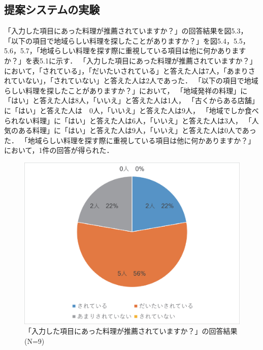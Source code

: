 \documentclass{funthesis}
\begin{document}
\subsection{提案システムの実験}
「入力した項目にあった料理が推薦されていますか？」の回答結果を図5.3，
「以下の項目で地域らしい料理を探したことがありますか？」を図5.4，5.5，5.6，5.7，「地域らしい料理を探す際に重視している項目は他に何かありますか？」を表5.1に示す．
「入力した項目にあった料理が推薦されていますか？」において，「されている」，「だいたいされている」と答えた人は7人，「あまりされていない」，「されていない」と答えた人は2人であった．
「以下の項目で地域らしい料理を探したことがありますか？」において，
「地域発祥の料理」に「はい」と答えた人は8人，「いいえ」と答えた人は1人，
「古くからある店舗」に「はい」と答えた人は　0人，「いいえ」と答えた人は9人，
「地域でしか食べられない料理」に「はい」と答えた人は6人，「いいえ」と答えた人は3人，
「人気のある料理」に「はい」と答えた人は9人，「いいえ」と答えた人は0人であった．
「地域らしい料理を探す際に重視している項目は他に何かありますか？」において，1件の回答が得られた．

\begin{figure}[tbp]
  \begin{center}
    \includegraphics[clip,width=12cm]{5.3.eps}
    \caption[「入力した項目にあった料理が推薦されていますか？」の回答結果]{「入力した項目にあった料理が推薦されていますか？」の回答結果(N=9)}
  \end{center}
\end{figure}
\end{document}
